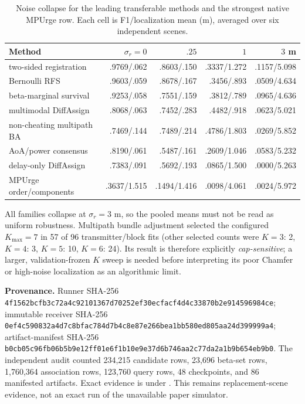 \begin{table}[ht]
\centering\scriptsize
\caption{Noise collapse for the leading transferable methods and the strongest
native MPUrge row. Each cell is F1/localization mean (m), averaged over six
independent scenes.}\label{tab:mpurge-vt-noise-collapse}
\begin{tabular}{lrrrr}
\toprule
Method & $\sigma_r=0$ & $.25$ & $1$ & $3$ m \\
\midrule
two-sided registration & .9769/.062 & .8603/.150 & .3337/1.272 & .1157/5.098 \\
Bernoulli RFS & .9603/.059 & .8678/.167 & .3456/.893 & .0509/4.634 \\
beta-marginal survival & .9253/.058 & .7551/.159 & .3812/.789 & .0965/4.636 \\
multimodal DiffAssign & .8068/.063 & .7452/.283 & .4482/.918 & .0623/5.021 \\
non-cheating multipath BA & .7469/.144 & .7489/.214 & .4786/1.803 & .0269/5.852 \\
AoA/power consensus & .8190/.061 & .5487/.161 & .2609/1.046 & .0583/5.232 \\
delay-only DiffAssign & .7383/.091 & .5692/.193 & .0865/1.500 & .0000/5.263 \\
MPUrge order/components & .3637/1.515 & .1494/1.416 & .0098/4.061 & .0024/5.972 \\
\bottomrule
\end{tabular}
\end{table}

All families collapse at $\sigma_r=3$ m, so the pooled means must not be read as
uniform robustness.  Multipath bundle adjustment selected the configured
$K_{\max}=7$ in 57 of 96 transmitter/block fits (other selected counts were
$K=3$: 2, $K=4$: 3, $K=5$: 10, $K=6$: 24).  Its result is therefore explicitly
\emph{cap-sensitive}; a larger, validation-frozen $K$ sweep is needed before
interpreting its poor Chamfer or high-noise localization as an algorithmic
limit.

\noindent\textbf{Provenance.} Runner SHA-256
\texttt{4f1562bcfb3c72a4c92101367d70252e}\allowbreak\texttt{f30ecfacf4d4c33870b2e914596984ce};
immutable receiver SHA-256
\texttt{0ef4c590832a4d7c8bfac784d7b4c8e}\allowbreak\texttt{87e266bea1bb580ed805aa24d399999a4};
artifact-manifest SHA-256
\texttt{b0cb05c96fb06b5b9e12ff01e6f1b10e}\allowbreak\texttt{9e37d6b746aa2c77da2a1b9b654eb9b0}.
The independent audit counted 234,215 candidate rows, 23,696 beta-set rows,
1,760,364 association rows, 123,760 query rows, 48 checkpoints, and 86
manifested artifacts.  Exact evidence is under
.  This remains
replacement-scene evidence, not an exact run of the unavailable paper
simulator.

